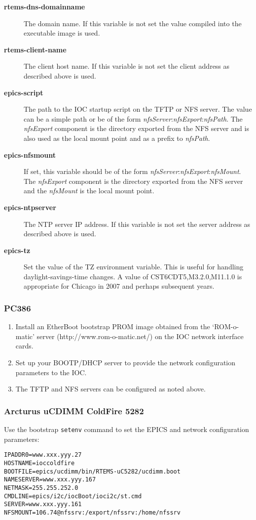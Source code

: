 \documentclass{report}
\begin{document}
\begin{description}
\item[{\bf rtems-dns-domainname}]
The domain name.  If this variable is not set the value compiled into the executable image is used.

\item[{\bf rtems-client-name}]
The client host name.  If this variable is not set the client address as described above is used.

\item[{\bf epics-script}]
The path to the IOC startup script on the TFTP or NFS server. 
The value can be a simple path or be of the form
\textit{nfsServer}:\textit{nfsExport}:\textit{nfsPath}.
The \textit{nfsExport} component is the directory exported from the NFS server and is also used as the local mount point and as a prefix to \textit{nfsPath}.


\item[{\bf epics-nfsmount}]
If set, this variable should be of the form
\textit{nfsServer}:\textit{nfsExport}:\textit{nfsMount}.
The \textit{nfsExport} component is the directory exported from the NFS server
and the \textit{nfsMount} is the local mount point.

\item[{\bf epics-ntpserver}]
The NTP server IP address.  If this variable is not set the server address as described above is used.

\item[{\bf epics-tz}]
Set the value of the TZ environment variable.
This is useful for handling daylight-savings-time changes.  A value of
CST6CDT5,M3.2.0,M11.1.0 is appropriate for Chicago in 2007 and perhaps subsequent years.

\end{description}

\subsubsection{PC386}
\begin{enumerate}
\item Install an EtherBoot bootstrap PROM image obtained from
the `ROM-o-matic' server (http://www.rom-o-matic.net/) on the IOC
network interface cards.
\item Set up your BOOTP/DHCP server to provide the network configuration
parameters to the IOC.
\item The TFTP and NFS servers can be configured as noted above.
\end{enumerate}

\subsubsection{Arcturus uCDIMM ColdFire 5282}
Use the bootstrap {\tt setenv} command to set the EPICS and network
configuration parameters:
\begin{verbatim}
IPADDR0=www.xxx.yyy.27
HOSTNAME=ioccoldfire
BOOTFILE=epics/ucdimm/bin/RTEMS-uC5282/ucdimm.boot
NAMESERVER=www.xxx.yyy.167
NETMASK=255.255.252.0
CMDLINE=epics/i2c/iocBoot/ioci2c/st.cmd
SERVER=www.xxx.yyy.161
NFSMOUNT=106.74@nfssrv:/export/nfssrv:/home/nfssrv
\end{verbatim}
\end{document}
